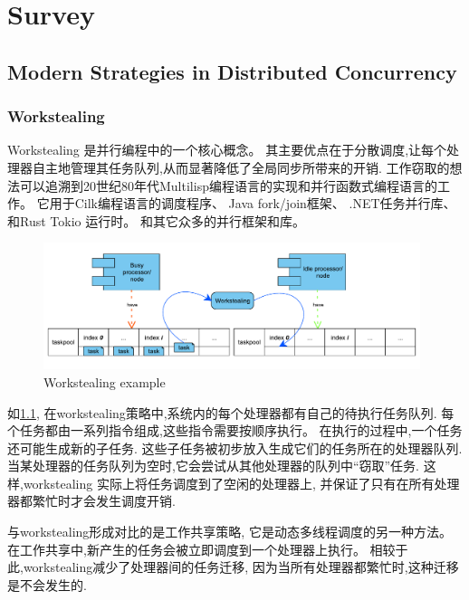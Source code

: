 \documentclass{mproj}
\begin{document}
\chapter{Survey}\label{survey}


\section{Modern Strategies in Distributed Concurrency}
\subsection{Workstealing}
Workstealing 是并行编程中的一个核心概念。
其主要优点在于分散调度,让每个处理器自主地管理其任务队列,从而显著降低了全局同步所带来的开销.
工作窃取的想法可以追溯到20世纪80年代Multilisp编程语言的实现和并行函数式编程语言的工作\cite{10.1145/324133.324234}。
它用于Cilk编程语言的调度程序\cite{BLUMOFE199655}、
Java fork/join框架\cite{lea2000forkjoin}、
.NET任务并行库\cite{leijen2009design}、
和Rust Tokio 运行时\cite{tokio,krill2021tokio}。
和其它众多的并行框架和库。

\begin{figure}[h]
    \centering %
    \includegraphics[width=0.98\textwidth]{images/workstealing.pdf} %
    \caption{Workstealing example} %
    \label{fig:workstealing} %
\end{figure}
\FloatBarrier

如\cref{fig:workstealing},
在workstealing策略中,系统内的每个处理器都有自己的待执行任务队列.
每个任务都由一系列指令组成,这些指令需要按顺序执行。
在执行的过程中,一个任务还可能生成新的子任务.
这些子任务被初步放入生成它们的任务所在的处理器队列.
当某处理器的任务队列为空时,它会尝试从其他处理器的队列中“窃取”任务.
这样,workstealing 实际上将任务调度到了空闲的处理器上,
并保证了只有在所有处理器都繁忙时才会发生调度开销.\cite{10.1145/1248377.1248396}

与workstealing形成对比的是工作共享策略,
它是动态多线程调度的另一种方法。
在工作共享中,新产生的任务会被立即调度到一个处理器上执行。
相较于此,workstealing减少了处理器间的任务迁移,
因为当所有处理器都繁忙时,这种迁移是不会发生的.\cite{10.1145/324133.324234}
\end{document}
